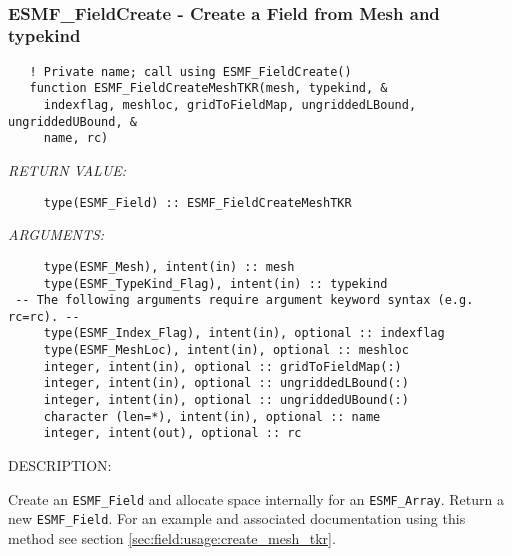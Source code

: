  
\mbox{}\hrulefill\ 
 
\subsubsection [ESMF\_FieldCreate] {ESMF\_FieldCreate - Create a Field from Mesh and typekind}


\begin{verbatim}   ! Private name; call using ESMF_FieldCreate()
   function ESMF_FieldCreateMeshTKR(mesh, typekind, &
     indexflag, meshloc, gridToFieldMap, ungriddedLBound, ungriddedUBound, &
     name, rc)\end{verbatim}{\em RETURN VALUE:}
\begin{verbatim}     type(ESMF_Field) :: ESMF_FieldCreateMeshTKR\end{verbatim}{\em ARGUMENTS:}
\begin{verbatim}     type(ESMF_Mesh), intent(in) :: mesh
     type(ESMF_TypeKind_Flag), intent(in) :: typekind
 -- The following arguments require argument keyword syntax (e.g. rc=rc). --
     type(ESMF_Index_Flag), intent(in), optional :: indexflag
     type(ESMF_MeshLoc), intent(in), optional :: meshloc
     integer, intent(in), optional :: gridToFieldMap(:)
     integer, intent(in), optional :: ungriddedLBound(:)
     integer, intent(in), optional :: ungriddedUBound(:)
     character (len=*), intent(in), optional :: name
     integer, intent(out), optional :: rc\end{verbatim}
{\sf DESCRIPTION:\\ }


   Create an {\tt ESMF\_Field} and allocate space internally for an
   {\tt ESMF\_Array}. Return a new {\tt ESMF\_Field}. For an example and
   associated documentation using this method see section
   \ref{sec:field:usage:create_mesh_tkr}.
  
